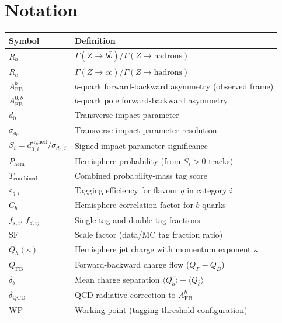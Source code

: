 \documentclass[11pt,a4paper]{article}
\begin{document}
\section*{Notation}

\begin{table}[htbp]
\centering
\begin{tabular}{ll}
\toprule
Symbol & Definition \\
\midrule
$R_b$ & $\Gamma(Z \to b\bar{b}) / \Gamma(Z \to \mathrm{hadrons})$ \\
$R_c$ & $\Gamma(Z \to c\bar{c}) / \Gamma(Z \to \mathrm{hadrons})$ \\
$A_\mathrm{FB}^b$ & $b$-quark forward-backward asymmetry (observed frame) \\
$A_\mathrm{FB}^{0,b}$ & $b$-quark pole forward-backward asymmetry \\
$d_0$ & Transverse impact parameter \\
$\sigma_{d_0}$ & Transverse impact parameter resolution \\
$S_i = d_{0,i}^\mathrm{signed}/\sigma_{d_0,i}$ & Signed impact parameter significance \\
$P_\mathrm{hem}$ & Hemisphere probability (from $S_i > 0$ tracks) \\
$T_\mathrm{combined}$ & Combined probability-mass tag score \\
$\varepsilon_{q,i}$ & Tagging efficiency for flavour $q$ in category $i$ \\
$C_b$ & Hemisphere correlation factor for $b$ quarks \\
$f_{s,i}$, $f_{d,ij}$ & Single-tag and double-tag fractions \\
SF & Scale factor (data/MC tag fraction ratio) \\
$Q_h(\kappa)$ & Hemisphere jet charge with momentum exponent $\kappa$ \\
$Q_\mathrm{FB}$ & Forward-backward charge flow ($Q_F - Q_B$) \\
$\delta_b$ & Mean charge separation $\langle Q_b \rangle - \langle Q_{\bar{b}} \rangle$ \\
$\delta_\mathrm{QCD}$ & QCD radiative correction to $A_\mathrm{FB}^b$ \\
WP & Working point (tagging threshold configuration) \\
\bottomrule
\end{tabular}
\end{table}

\clearpage

\end{document}
